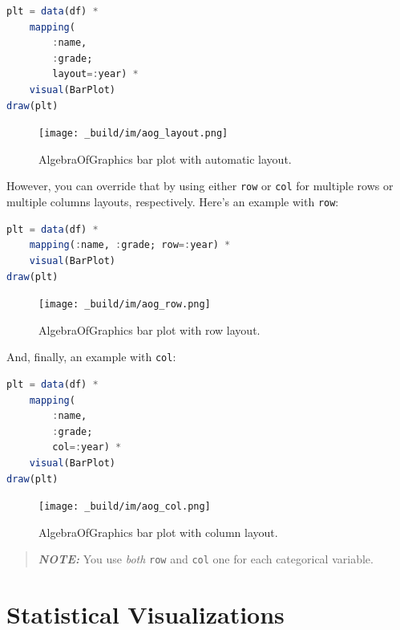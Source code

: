 \documentclass[
  notoc %
]{tufte-book}
\newcommand{\passthrough}[1]{#1}
\begin{document}
\begin{lstlisting}[language=Julia]
plt = data(df) *
    mapping(
        :name,
        :grade;
        layout=:year) *
    visual(BarPlot)
draw(plt)
\end{lstlisting}

\begin{figure}
\hypertarget{fig:aog_layout}{%
\centering
\texttt{[image: \_build/im/aog\_layout.png]}
\caption{AlgebraOfGraphics bar plot with automatic
layout.}\label{fig:aog_layout}
}
\end{figure}

However, you can override that by using either
\passthrough{\lstinline!row!} or \passthrough{\lstinline!col!} for
multiple rows or multiple columns layouts, respectively. Here's an
example with \passthrough{\lstinline!row!}:

\begin{lstlisting}[language=Julia]
plt = data(df) *
    mapping(:name, :grade; row=:year) *
    visual(BarPlot)
draw(plt)
\end{lstlisting}

\begin{figure}
\hypertarget{fig:aog_row}{%
\centering
\texttt{[image: \_build/im/aog\_row.png]}
\caption{AlgebraOfGraphics bar plot with row layout.}\label{fig:aog_row}
}
\end{figure}

And, finally, an example with \passthrough{\lstinline!col!}:

\begin{lstlisting}[language=Julia]
plt = data(df) *
    mapping(
        :name,
        :grade;
        col=:year) *
    visual(BarPlot)
draw(plt)
\end{lstlisting}

\begin{figure}
\hypertarget{fig:aog_col}{%
\centering
\texttt{[image: \_build/im/aog\_col.png]}
\caption{AlgebraOfGraphics bar plot with column
layout.}\label{fig:aog_col}
}
\end{figure}

\begin{quote}
\textbf{\emph{NOTE:}} You use \emph{both} \passthrough{\lstinline!row!}
and \passthrough{\lstinline!col!} one for each categorical variable.
\end{quote}

\hypertarget{sec:aog_stats}{%
\section{Statistical Visualizations}\label{sec:aog_stats}}
\end{document}
